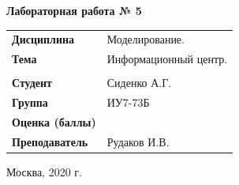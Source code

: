 \documentclass[a4paper,14pt]{extreport} %
\begin{document}
\begin{titlepage}
    \vspace{2cm}

    \begin{center}
        \textbf{Лабораторная работа № 5} \\
        \vspace{0.5cm}
    \end{center}

    \vspace{4cm}

    \begin{flushleft}
        \begin{tabular}{ll}
            \textbf{Дисциплина} & Моделирование.  \\
            \textbf{Тема} & Информационный центр.  \\
            \\
            \textbf{Студент} & Сиденко А.Г. \\
            \textbf{Группа} & ИУ7-73Б \\
            \textbf{Оценка (баллы)} & \\
            \textbf{Преподаватель} & Рудаков И.В.   \\
        \end{tabular}
    \end{flushleft}

    \vspace{4cm}

   \begin{center}
        Москва, 2020 г.
    \end{center}

\end{titlepage}
\end{document}
